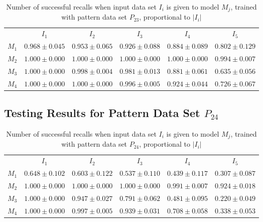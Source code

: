 \documentclass[12pt]{article}
\begin{document}
\begin{appendices}
\begin{table}[H]
\begin{tabular}{cccccc}
 & $I_{1}$  & $I_{2}$  & $I_{3}$  & $I_{4}$  & $I_{5}$ \\ \cline{2-6}
$M_{1}$  & $0.968\pm0.045$  & $0.953\pm0.065$  & $0.926\pm0.088$  & $0.884\pm0.089$  & $0.802\pm0.129$ \\
$M_{2}$  & $1.000\pm0.000$  & $1.000\pm0.000$  & $1.000\pm0.000$  & $1.000\pm0.000$  & $0.994\pm0.007$ \\
$M_{3}$  & $1.000\pm0.000$  & $0.998\pm0.004$  & $0.981\pm0.013$  & $0.881\pm0.061$  & $0.635\pm0.056$ \\
$M_{4}$  & $1.000\pm0.000$  & $1.000\pm0.000$  & $0.996\pm0.005$  & $0.924\pm0.044$  & $0.726\pm0.067$ \\

    \end{tabular}
    \caption{Number of successful recalls when input data set $I_i$ is given to model $M_j$, trained with pattern data set $P_{23}$, proportional to $\left|I_i\right|$}
    \end{table}
    
\subsection{Testing Results for Pattern Data Set $P_{24}$}


    \begin{table}[H]
    \centering
    \def\arraystretch{1.5}
    \footnotesize
    \begin{tabular}{cccccc}
    
 & $I_{1}$  & $I_{2}$  & $I_{3}$  & $I_{4}$  & $I_{5}$ \\ \cline{2-6}
$M_{1}$  & $0.648\pm0.102$  & $0.603\pm0.122$  & $0.537\pm0.110$  & $0.439\pm0.117$  & $0.307\pm0.087$ \\
$M_{2}$  & $1.000\pm0.000$  & $1.000\pm0.000$  & $1.000\pm0.000$  & $0.991\pm0.007$  & $0.924\pm0.018$ \\
$M_{3}$  & $1.000\pm0.000$  & $0.947\pm0.027$  & $0.791\pm0.062$  & $0.481\pm0.095$  & $0.220\pm0.049$ \\
$M_{4}$  & $1.000\pm0.000$  & $0.997\pm0.005$  & $0.939\pm0.031$  & $0.708\pm0.058$  & $0.338\pm0.053$ \\

    \end{tabular}
    \caption{Number of successful recalls when input data set $I_i$ is given to model $M_j$, trained with pattern data set $P_{24}$, proportional to $\left|I_i\right|$}
    \end{table}
    

\end{appendices}
\end{document}
